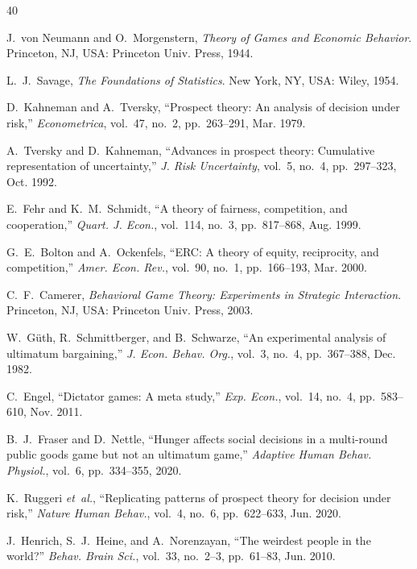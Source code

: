 \documentclass[journal]{IEEEtran}
\begin{document}
\begin{thebibliography}{40}

J.~von Neumann and O.~Morgenstern, \emph{Theory of Games and Economic Behavior}.
Princeton, NJ, USA: Princeton Univ. Press, 1944.

L.~J.~Savage, \emph{The Foundations of Statistics}.
New York, NY, USA: Wiley, 1954.

D.~Kahneman and A.~Tversky, ``Prospect theory: An analysis of decision under risk,''
\emph{Econometrica}, vol.~47, no.~2, pp.~263--291, Mar. 1979.

A.~Tversky and D.~Kahneman, ``Advances in prospect theory: Cumulative representation of uncertainty,''
\emph{J. Risk Uncertainty}, vol.~5, no.~4, pp.~297--323, Oct. 1992.

E.~Fehr and K.~M.~Schmidt, ``A theory of fairness, competition, and cooperation,''
\emph{Quart. J. Econ.}, vol.~114, no.~3, pp.~817--868, Aug. 1999.

G.~E.~Bolton and A.~Ockenfels, ``ERC: A theory of equity, reciprocity, and competition,''
\emph{Amer. Econ. Rev.}, vol.~90, no.~1, pp.~166--193, Mar. 2000.

C.~F.~Camerer, \emph{Behavioral Game Theory: Experiments in Strategic Interaction}.
Princeton, NJ, USA: Princeton Univ. Press, 2003.

W.~G\"{u}th, R.~Schmittberger, and B.~Schwarze, ``An experimental analysis of ultimatum bargaining,''
\emph{J. Econ. Behav. Org.}, vol.~3, no.~4, pp.~367--388, Dec. 1982.

C.~Engel, ``Dictator games: A meta study,''
\emph{Exp. Econ.}, vol.~14, no.~4, pp.~583--610, Nov. 2011.

B.~J.~Fraser and D.~Nettle, ``Hunger affects social decisions in a multi-round public goods game but not an ultimatum game,''
\emph{Adaptive Human Behav. Physiol.}, vol.~6, pp.~334--355, 2020.

K.~Ruggeri \emph{et~al.}, ``Replicating patterns of prospect theory for decision under risk,''
\emph{Nature Human Behav.}, vol.~4, no.~6, pp.~622--633, Jun. 2020.

J.~Henrich, S.~J.~Heine, and A.~Norenzayan, ``The weirdest people in the world?''
\emph{Behav. Brain Sci.}, vol.~33, no.~2--3, pp.~61--83, Jun. 2010.


\end{thebibliography}
\end{document}
